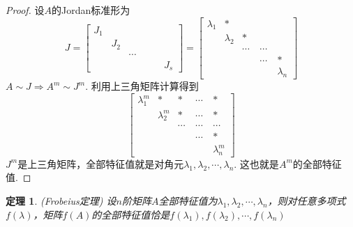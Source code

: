 \documentclass[a4paper,11pt]{article}
\newtheorem{theorem}{\hspace{2em}定理}[section]
\newtheorem{proof}{证明}[section]
\begin{document}
    \begin{proof}
        设$A$的Jordan标准形为
        \begin{equation*}
            J=\begin{bmatrix}
                J_1&\quad&\quad&\quad\\
                \quad&J_2&\quad&\quad\\
                \quad&\quad&\cdots&\quad\\
                \quad&\quad&\quad&\quad&J_s
            \end{bmatrix}=\begin{bmatrix}
                \lambda_1&*&\quad&\quad&\quad\\
                \quad&\lambda_2&*&\quad&\quad\\
                \quad&\quad&\cdots&\cdots&\quad\\
                \quad&\quad&\quad&\cdots&*\\
                \quad&\quad&\quad&\quad&\lambda_n
            \end{bmatrix}
        \end{equation*}
        $A\sim J\Rightarrow A^m\sim J^m$. 利用上三角矩阵计算得到
        \begin{equation*}
            \begin{bmatrix}
                \lambda_1^m&*&*&\cdots&*\\
                \quad&\lambda_2^m&*&\cdots&*\\
                \quad&\quad&\cdots&\cdots&\cdots\\
                \quad&\quad&\quad&\cdots&*\\
                \quad&\quad&\quad&\quad&\lambda_n^m
            \end{bmatrix}
        \end{equation*}
        $J^m$是上三角矩阵，全部特征值就是对角元$\lambda_1,\lambda_2,\cdots,\lambda_n$. 这也就是$A^m$的全部特征值.
    \end{proof}
    \begin{theorem}(Frobeius定理)
        设$n$阶矩阵$A$全部特征值为$\lambda_1,\lambda_2,\cdots,\lambda_n$，则对任意多项式$f(\lambda)$，矩阵$f(A)$的全部特征值恰是$f(\lambda_1),f(\lambda_2),\cdots,f(\lambda_n)$
    \end{theorem}
\end{document}
